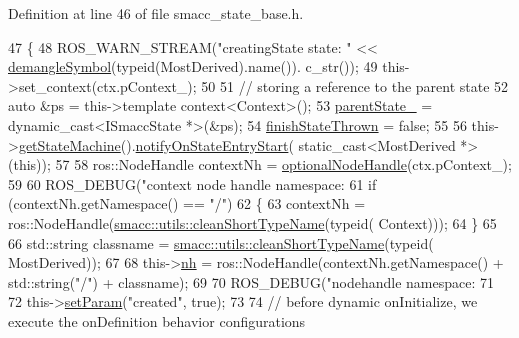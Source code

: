 Definition at line 46 of file smacc\+\_\+state\+\_\+base.\+h.


\begin{DoxyCode}
47   \{
48     ROS\_WARN\_STREAM(\textcolor{stringliteral}{"creatingState state: "} << \hyperlink{namespacesmacc_1_1introspection_a2f495108db3e57604d8d3ff5ef030302}{demangleSymbol}(\textcolor{keyword}{typeid}(MostDerived).name()).
      c\_str());
49     this->set\_context(ctx.pContext\_);
50 
51     \textcolor{comment}{// storing a reference to the parent state}
52     \textcolor{keyword}{auto} &ps = this->\textcolor{keyword}{template} context<Context>();
53     \hyperlink{classsmacc_1_1ISmaccState_ad61db41d8d06a836e7d1dac7767f5695}{parentState\_} = \textcolor{keyword}{dynamic\_cast<}ISmaccState *\textcolor{keyword}{>}(&ps);
54     \hyperlink{classsmacc_1_1SmaccState_a6c40f733c35ddfb9ae2a2f8e9bab07d3}{finishStateThrown} = \textcolor{keyword}{false};
55 
56     this->\hyperlink{classsmacc_1_1SmaccState_afc39f8e0ca4001b2159a100da2fccd0e}{getStateMachine}().\hyperlink{classsmacc_1_1ISmaccStateMachine_aeec54e997d715b105ebfeb5caadc4fbf}{notifyOnStateEntryStart}(
      static\_cast<MostDerived *>(\textcolor{keyword}{this}));
57 
58     ros::NodeHandle contextNh = \hyperlink{namespacesmacc_1_1introspection_a8acc3b4146a8b2bb0a9fa4178840e9b9}{optionalNodeHandle}(ctx.pContext\_);
59 
60     ROS\_DEBUG(\textcolor{stringliteral}{"context node handle namespace: %
61     \textcolor{keywordflow}{if} (contextNh.getNamespace() == \textcolor{stringliteral}{"/"})
62     \{
63       contextNh = ros::NodeHandle(\hyperlink{namespacesmacc_1_1utils_aacd1975bb7cd9bec4b50e111a2ae7edb}{smacc::utils::cleanShortTypeName}(\textcolor{keyword}{typeid}(
      Context)));
64     \}
65 
66     std::string classname = \hyperlink{namespacesmacc_1_1utils_aacd1975bb7cd9bec4b50e111a2ae7edb}{smacc::utils::cleanShortTypeName}(\textcolor{keyword}{typeid}(
      MostDerived));
67 
68     this->\hyperlink{classsmacc_1_1ISmaccState_a13fe6e6abfdb87996402189d44b78494}{nh} = ros::NodeHandle(contextNh.getNamespace() + std::string(\textcolor{stringliteral}{"/"}) + classname);
69 
70     ROS\_DEBUG(\textcolor{stringliteral}{"nodehandle namespace: %
71 
72     this->\hyperlink{classsmacc_1_1ISmaccState_a0b6c531ca8c446052022308548f55b92}{setParam}(\textcolor{stringliteral}{"created"}, \textcolor{keyword}{true});
73 
74     \textcolor{comment}{// before dynamic onInitialize, we execute the onDefinition behavior configurations}
}}
\end{DoxyCode}

